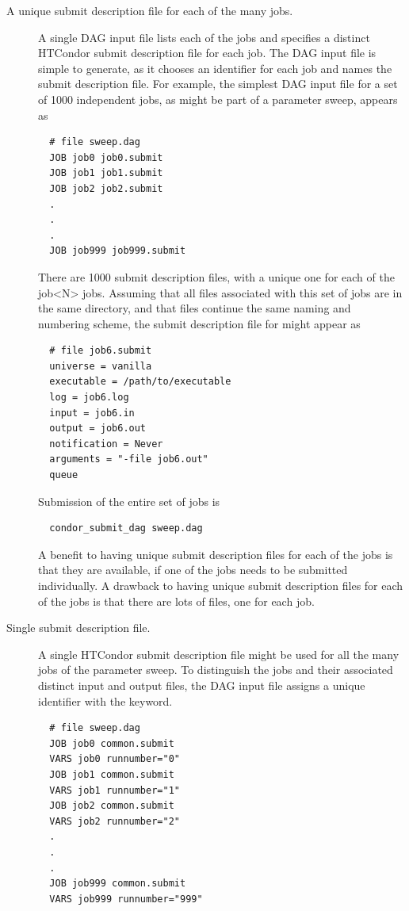 \begin{description}
\item[A unique submit description file for each of the many jobs.]
A single DAG input file lists each of the jobs and specifies
a distinct HTCondor submit description file for each job.
The DAG input file is simple to generate, as it chooses an
identifier for each job and names the submit description file.
For example, the simplest DAG input file for a set of 1000 independent jobs,
as might be part of a parameter sweep, appears as
\begin{verbatim}
  # file sweep.dag
  JOB job0 job0.submit
  JOB job1 job1.submit
  JOB job2 job2.submit
  .
  .
  .
  JOB job999 job999.submit
\end{verbatim}
There are 1000 submit description files, with a unique one for
each of the job<N> jobs.
Assuming that all files associated with this set of jobs are in the
same directory, and that files continue the same naming and numbering
scheme, the submit description file for 
might appear as
\begin{verbatim}
  # file job6.submit
  universe = vanilla
  executable = /path/to/executable
  log = job6.log
  input = job6.in
  output = job6.out
  notification = Never
  arguments = "-file job6.out"
  queue
\end{verbatim}

Submission of the entire set of jobs is
\begin{verbatim}
  condor_submit_dag sweep.dag
\end{verbatim}

A benefit to having unique submit description files for each of the
jobs is that they are available, if one of the jobs needs to be
submitted individually.
A drawback to having unique submit description files for each of the jobs
is that there are lots of files, one for each job.

\item[Single submit description file.]
A single HTCondor submit description file might be used for all the many
jobs of the parameter sweep.
To distinguish the jobs and their associated distinct input and output files,
the DAG input file assigns a unique identifier with the  keyword.
\begin{verbatim}
  # file sweep.dag
  JOB job0 common.submit
  VARS job0 runnumber="0"
  JOB job1 common.submit
  VARS job1 runnumber="1"
  JOB job2 common.submit
  VARS job2 runnumber="2"
  .
  .
  .
  JOB job999 common.submit
  VARS job999 runnumber="999"
\end{verbatim}


\end{description}

